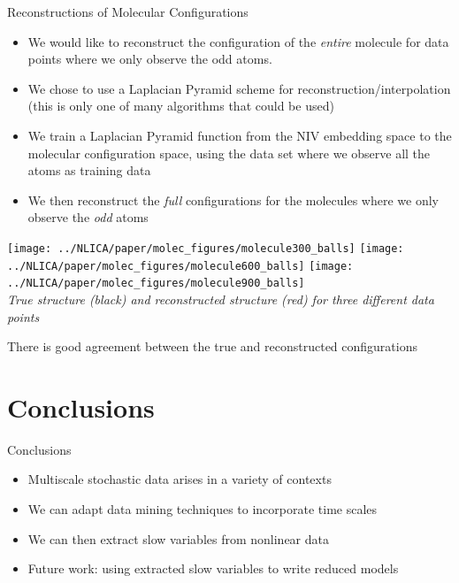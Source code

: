 \documentclass[12pt]{beamer}
\begin{document}
\begin{frame}{Reconstructions of Molecular Configurations}

	\begin{itemize}
		\item We would like to reconstruct the configuration of the {\em entire} molecule for data points where we only observe the odd atoms.
		\item We chose to use a Laplacian Pyramid scheme for reconstruction/interpolation (this is only one of many algorithms that could be used)
		\item We train a Laplacian Pyramid function from the NIV embedding space to the molecular configuration space, using the data set where we observe all the atoms as training data
		
		\item We then reconstruct the {\em full} configurations for the molecules where we only observe the {\em odd} atoms

	\end{itemize}

	\centering
	\texttt{[image: ../NLICA/paper/molec\_figures/molecule300\_balls]}
	\hspace{0.05\textwidth}
	\texttt{[image: ../NLICA/paper/molec\_figures/molecule600\_balls]}
	\hspace{0.05\textwidth}
	\texttt{[image: ../NLICA/paper/molec\_figures/molecule900\_balls]}\\
	{\small \em True structure (black) and reconstructed structure (red) for three different data points}

	\vspace{0.2in}
	
	There is good agreement between the true and reconstructed configurations

\section{Conclusions}

\begin{frame}{Conclusions}

\begin{itemize}
\item Multiscale stochastic data arises in a variety of contexts
\item We can adapt data mining techniques to incorporate time scales
\item We can then extract slow variables from nonlinear data
\item Future work: using extracted slow variables to write reduced models


\end{itemize}
\end{frame}
\end{frame}
\end{document}
